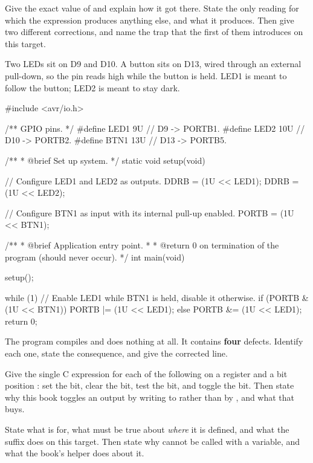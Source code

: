 \noindent Give the exact value of  and explain how it got there. State the only reading
for which the expression produces anything else, and what it produces. Then give two different
corrections, and name the trap that the first of them introduces on this target. 

\label{exa:q:2}

Two LEDs sit on D9 and D10. A button sits on D13, wired through an external pull-down, so the pin
reads high while the button is held. LED1 is meant to follow the button; LED2 is meant to stay
dark.

\begin{ccode}
#include <avr/io.h>

/** GPIO pins. */
#define LED1 9U  // D9  -> PORTB1.
#define LED2 10U // D10 -> PORTB2.
#define BTN1 13U // D13 -> PORTB5.

/**
 * @brief Set up system.
 */
static void setup(void)
{
    // Configure LED1 and LED2 as outputs.
    DDRB = (1U << LED1);
    DDRB = (1U << LED2);

    // Configure BTN1 as input with its internal pull-up enabled.
    PORTB = (1U << BTN1);
}

/**
 * @brief Application entry point.
 *
 * @return 0 on termination of the program (should never occur).
 */
int main(void)
{
    setup();

    while (1)
    {
        // Enable LED1 while BTN1 is held, disable it otherwise.
        if (PORTB & (1U << BTN1)) { PORTB |= (1U << LED1); }
        else { PORTB &= (1U << LED1); }
    }
    return 0;
}
\end{ccode}

 The program compiles and does nothing at all. It contains \textbf{four} defects. Identify
each one, state the consequence, and give the corrected line. 

 Give the single C expression for each of the following on a register  and a bit
position : set the bit, clear the bit, test the bit, and toggle the bit. Then state why
this book toggles an output by writing to  rather than by , and
what that buys. 

 State what  is for, what must be true about \emph{where} it is defined, and
what the  suffix does on this target. Then state why  cannot be called
with a variable, and what the book's  helper does about it. 

